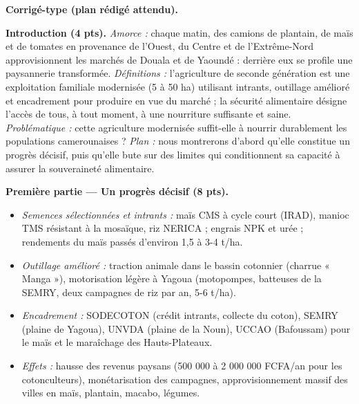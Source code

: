 \documentclass[11pt]{article}
\newcommand{\cle}[1]{{\popxbold\color{popdark}#1}}
\begin{document}
\begin{corrige}
\textbf{Corrigé-type (plan rédigé attendu).}

\textbf{Introduction (4 pts).} \emph{Amorce :} chaque matin, des camions de plantain, de maïs et de tomates en provenance de l'Ouest, du Centre et de l'Extrême-Nord approvisionnent les marchés de Douala et de Yaoundé : derrière eux se profile une paysannerie transformée. \emph{Définitions :} l'\cle{agriculture de seconde génération} est une exploitation familiale modernisée (5 à 50 ha) utilisant intrants, outillage amélioré et encadrement pour produire en vue du marché ; la \cle{sécurité alimentaire} désigne l'accès de tous, à tout moment, à une nourriture suffisante et saine. \emph{Problématique :} cette agriculture modernisée suffit-elle à nourrir durablement les populations camerounaises ? \emph{Plan :} nous montrerons d'abord qu'elle constitue un progrès décisif, puis qu'elle bute sur des limites qui conditionnent sa capacité à assurer la souveraineté alimentaire.

\textbf{Première partie — Un progrès décisif (8 pts).}
\begin{itemize}
\item \emph{Semences sélectionnées et intrants :} maïs CMS à cycle court (IRAD), manioc TMS résistant à la mosaïque, riz NERICA ; engrais NPK et urée ; rendements du maïs passés d'environ 1,5 à 3-4 t/ha.
\item \emph{Outillage amélioré :} traction animale dans le bassin cotonnier (charrue « Manga »), motorisation légère à Yagoua (motopompes, batteuses de la SEMRY, deux campagnes de riz par an, 5-6 t/ha).
\item \emph{Encadrement :} SODECOTON (crédit intrants, collecte du coton), SEMRY (plaine de Yagoua), UNVDA (plaine de la Noun), UCCAO (Bafoussam) pour le maïs et le maraîchage des Hauts-Plateaux.
\item \emph{Effets :} hausse des revenus paysans (500 000 à 2 000 000 FCFA/an pour les cotonculteurs), monétarisation des campagnes, approvisionnement massif des villes en maïs, plantain, macabo, légumes.
\end{itemize}


\end{corrige}
\end{document}
